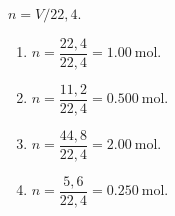 \documentclass[11pt,a4paper]{article}
\begin{document}
\begin{corrige}
$n = V / 22{,}4$.
\begin{enumerate}[label=\alph*)]
  \item $n = \dfrac{22{,}4}{22{,}4} = \SI{1.00}{\mole}$.
  \item $n = \dfrac{11{,}2}{22{,}4} = \SI{0.500}{\mole}$.
  \item $n = \dfrac{44{,}8}{22{,}4} = \SI{2.00}{\mole}$.
  \item $n = \dfrac{5{,}6}{22{,}4} = \SI{0.250}{\mole}$.
\end{enumerate}
\end{corrige}
\end{document}

